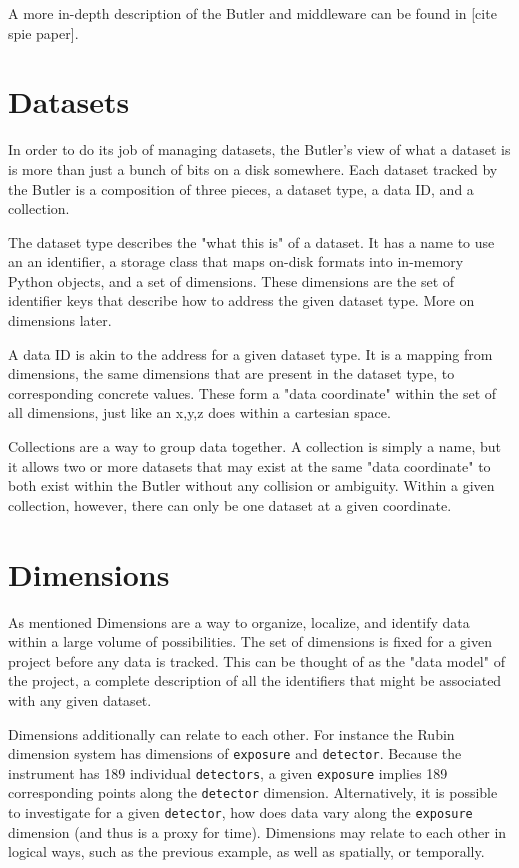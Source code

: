 A more in-depth description of the Butler and middleware can be found in [cite spie paper].

\section{Datasets}
In order to do its job of managing datasets, the Butler's view of what a dataset is is more than just a bunch of bits on a disk somewhere. Each dataset tracked by the Butler is a composition of three pieces, a dataset type, a data ID, and a collection.

The dataset type describes the "what this is" of a dataset. It has a name to use an an identifier, a storage class that maps on-disk formats into in-memory Python objects, and a set of dimensions. These dimensions are the set of identifier keys that describe how to address the given dataset type. More on dimensions later.

A data ID is akin to the address for a given dataset type. It is a mapping from dimensions, the same dimensions that are present in the dataset type, to corresponding concrete values. These form a "data coordinate" within the set of all dimensions, just like an x,y,z does within a cartesian space.

Collections are a way to group data together. A collection is simply a name, but it allows two or more datasets that may exist at the same "data coordinate" to both exist within the Butler without any collision or ambiguity. Within a given collection, however, there can only be one dataset at a given coordinate.

\section{Dimensions}
As mentioned Dimensions are a way to organize, localize, and identify data within a large volume of possibilities. The set of dimensions is fixed for a given project before any data is tracked. This can be thought of as the "data model" of the project, a complete description of all the identifiers that might be associated with any given dataset.

Dimensions additionally can relate to each other. For instance the Rubin dimension system has dimensions of \texttt{exposure} and \texttt{detector}. Because the instrument has 189 individual \texttt{detectors}, a given \texttt{exposure} implies 189 corresponding points along the \texttt{detector} dimension. Alternatively, it is possible to investigate for a given \texttt{detector}, how does data vary along the \texttt{exposure} dimension (and thus is a proxy for time). Dimensions may relate to each other in logical ways, such as the previous example, as well as spatially, or temporally.

